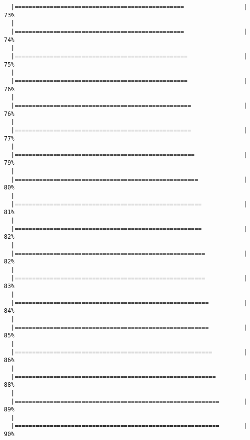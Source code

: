 \documentclass[]{article}
\begin{document}
\begin{verbatim}
  |================================================                 |  73%
  |                                                                       
  |================================================                 |  74%
  |                                                                       
  |=================================================                |  75%
  |                                                                       
  |=================================================                |  76%
  |                                                                       
  |==================================================               |  76%
  |                                                                       
  |==================================================               |  77%
  |                                                                       
  |===================================================              |  79%
  |                                                                       
  |====================================================             |  80%
  |                                                                       
  |=====================================================            |  81%
  |                                                                       
  |=====================================================            |  82%
  |                                                                       
  |======================================================           |  82%
  |                                                                       
  |======================================================           |  83%
  |                                                                       
  |=======================================================          |  84%
  |                                                                       
  |=======================================================          |  85%
  |                                                                       
  |========================================================         |  86%
  |                                                                       
  |=========================================================        |  88%
  |                                                                       
  |==========================================================       |  89%
  |                                                                       
  |==========================================================       |  90%

\end{verbatim}
\end{document}
